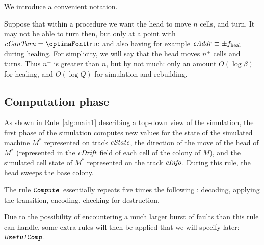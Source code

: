 \documentclass[12pt]{memoir}
\newcommand{\fld}[1]{\ensuremath{\textit{#1\/}}}
\newcommand{\rul}[1]{\ensuremath{\texttt{\slshape #1\/}}}
\newcommand{\tHeal}{f_{\mathrm{heal}}}
\def\B{B}
\newcommand{\Z}{Z}
\newcommand{\cAddr}{\fld{cAddr}}
\newcommand{\cCanTurn}{\fld{cCanTurn}}
\newcommand{\cDrift}{\fld{cDrift}}
\newcommand{\cInfo}{\fld{cInfo}}
\newcommand{\cState}{\fld{cState}}
\newcommand{\Comp}{\rul{Compute}}
\newcommand{\UsefulComp}{\rul{UsefulComp}}
\begin{document}

We introduce a convenient notation.
\begin{notation}\label{not:plus}
Suppose that within a procedure we want the head to move \( n \) cells, and turn.
It may not be able to turn then, but only at a point with \( \cCanTurn=\true \) and
also having  for example \( \cAddr\equiv\pm\tHeal \) during healing.
For simplicity, we will say that the head moves \( n^{+} \) cells and turns.
Thus \( n^{+} \) is greater than \( n \), but by not much: only an amount \( O(\log\beta) \) for healing,
and \( O(\log Q) \) for simulation and rebuilding.
\end{notation}

\subsection{Computation phase}\label{sec:computation-phase}

As shown in Rule~\ref{alg:main1} describing a top-down view of the simulation,
the first phase of the simulation computes new values for the state of the 
simulated machine \( M^{*} \)
represented on track \( \cState \), the direction of the move of the head of  \( M^{*} \)
(represented in the \( \cDrift \) field of each cell of the colony of \( M \)), and
the simulated cell state of \( M^{*} \) represented on the track \( \cInfo \).
During this rule, the head sweeps the base colony.

The rule \( \Comp \) essentially repeats five times the following :
decoding, applying the transition, encoding, checking for destruction.

Due to the possibility of encountering a much larger burst of faults than
this rule can handle, some extra rules will then be applied that we will specify later:
\( \UsefulComp \).  %
\end{document}

